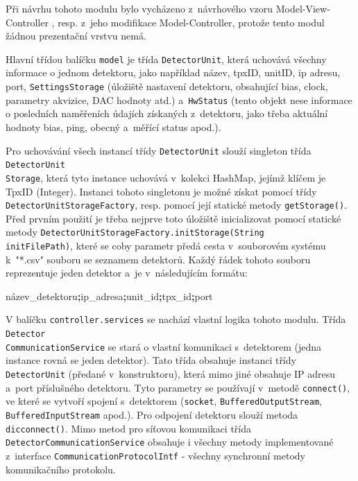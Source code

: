 Při návrhu tohoto modulu bylo vycházeno z~návrhového vzoru Model-View-Controller \cite{DesignPatterns-Gamma:1995:DPE:186897}, resp. z~jeho modifikace Model-Controller, protože tento modul žádnou prezentační vrstvu nemá. 

Hlavní třídou balíčku \texttt{model} je třída \texttt{DetectorUnit}, která uchovává všechny informace o jednom detektoru, jako například název, tpxID, unitID, ip adresu, port, \texttt{SettingsStorage} (úložiště nastavení detektoru, obsahující bias, clock, parametry akvizice, DAC hodnoty atd.) a~\texttt{HwStatus} (tento objekt nese informace o posledních naměřeních údajích získaných z~detektoru, jako třeba aktuální hodnoty bias, ping, obecný a~měřící status apod.).

Pro uchovávání všech instancí třídy \texttt{DetectorUnit} slouží singleton \cite{DesignPatterns-Gamma:1995:DPE:186897} třída \texttt{DetectorUnit\\Storage}, která tyto instance uchovává v~kolekci HashMap, jejímž klíčem je TpxID (Integer). Instanci tohoto singletonu je možné získat pomocí třídy \texttt{DetectorUnitStorageFactory}, resp. pomocí její statické metody \texttt{getStorage()}. Před prvním použití je třeba nejprve toto úložiště inicializovat pomocí statické metody \texttt{DetectorUnitStorageFactory.initStorage(String\\initFilePath)}, které se coby parametr předá cesta v~souborovém systému k~"*.csv" souboru se seznamem detektorů. Každý řádek tohoto souboru reprezentuje jeden detektor a~je v~následujícím formátu:
\begin{center}
	název\_detektoru\textbf{\Large{;}}ip\_adresa\textbf{\Large{;}}unit\_id\textbf{\Large{;}}tpx\_id\textbf{\Large{;}}port
\end{center}

V balíčku \texttt{controller.services} se nachází vlastní logika tohoto modulu. 
Třída \texttt{Detector\\CommunicationService} se stará o vlastní komunikaci s~detektorem (jedna instance rovná se jeden detektor). Tato třída obsahuje instanci třídy \texttt{DetectorUnit} (předané v~konstruktoru), která mimo jiné obsahuje IP adresu a~port příslušného detektoru. Tyto parametry se používají v~metodě \texttt{connect()}, ve které se vytvoří spojení s~detektorem (\texttt{socket}, \texttt{BufferedOutputStream}, \texttt{BufferedInputStream} apod.). Pro odpojení detektoru slouží metoda \texttt{dicconnect()}. Mimo metod pro síťovou komunikaci třída \texttt{DetectorCommunicationService} obsahuje i všechny metody implementované z~interface \texttt{CommunicationProtocolIntf} - všechny synchronní metody komunikačního protokolu. 

